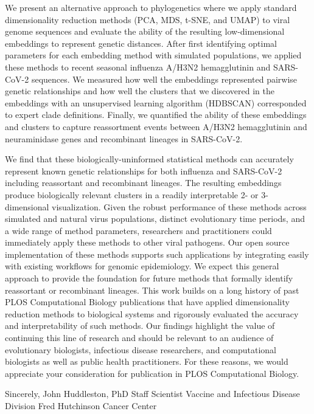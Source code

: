 \documentclass[11pt]{article}
\begin{document}
We present an alternative approach to phylogenetics where we apply standard dimensionality reduction methods (PCA, MDS, t-SNE, and UMAP) to viral genome sequences and evaluate the ability of the resulting low-dimensional embeddings to represent genetic distances.
After first identifying optimal parameters for each embedding method with simulated populations, we applied these methods to recent seasonal influenza A/H3N2 hemagglutinin and SARS-CoV-2 sequences.
We measured how well the embeddings represented pairwise genetic relationships and how well the clusters that we discovered in the embeddings with an unsupervised learning algorithm (HDBSCAN) corresponded to expert clade definitions.
Finally, we quantified the ability of these embeddings and clusters to capture reassortment events between A/H3N2 hemagglutinin and neuraminidase genes and recombinant lineages in SARS-CoV-2.

We find that these biologically-uninformed statistical methods can accurately represent known genetic relationships for both influenza and SARS-CoV-2 including reassortant and recombinant lineages.
The resulting embeddings produce biologically relevant clusters in a readily interpretable 2- or 3-dimensional visualization.
Given the robust performance of these methods across simulated and natural virus populations, distinct evolutionary time periods, and a wide range of method parameters, researchers and practitioners could immediately apply these methods to other viral pathogens.
Our open source implementation of these methods supports such applications by integrating easily with existing workflows for genomic epidemiology.
We expect this general approach to provide the foundation for future methods that formally identify reassortant or recombinant lineages.
\newpage
This work builds on a long history of past PLOS Computational Biology publications that have applied dimensionality reduction methods to biological systems and rigorously evaluated the accuracy and interpretability of such methods.
Our findings highlight the value of continuing this line of research and should be relevant to an audience of evolutionary biologists, infectious disease researchers, and computational biologists as well as public health practitioners.
For these reasons, we would appreciate your consideration for publication in PLOS Computational Biology.

\vspace{0.3in} %

Sincerely, \newline
\vspace{0.05in} \newline
John Huddleston, PhD \newline
Staff Scientist \newline
Vaccine and Infectious Disease Division \newline
Fred Hutchinson Cancer Center
\end{document}
